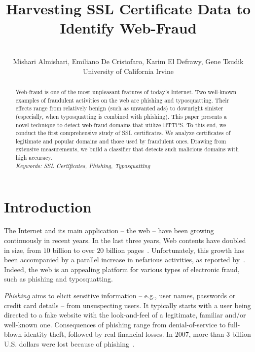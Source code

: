 \documentclass[twocolumn]{article}
\title{\huge\bf Harvesting SSL Certificate Data to\\Identify Web-Fraud}
\author{~\\ Mishari Almishari, Emiliano De Cristofaro, Karim El Defrawy, Gene Tsudik \vspace{0.1cm}\\
{University of California Irvine
   }\\
}
\date{}
\begin{document}
\maketitle
\thispagestyle{empty}
\begin{abstract}
Web-fraud is one of the most unpleasant features of today's Internet.
Two well-known examples of fraudulent activities on the web are phishing and typosquatting.
Their effects range from relatively benign (such as unwanted ads) to
downright sinister (especially, when typosquatting is combined with phishing).
This paper presents a novel technique to detect web-fraud domains that
utilize HTTPS. To this end, we conduct the first comprehensive study
of SSL certificates. We analyze certificates of legitimate and popular domains and
those used by fraudulent ones. Drawing from extensive measurements, we build
a classifier that detects such malicious domains with high accuracy. \vspace*{0.1cm}
~\\
{\it Keywords: SSL Certificates, Phishing, Typosquatting}
\end{abstract}


 \section{Introduction}\label{sec:introduction}
The Internet and its main application -- the web -- have been growing
continuously in recent years. In the last three years, Web contents have doubled in size, 
from $10$ billion to over $20$ billion pages~\cite{wwwsize}.
Unfortunately, this growth has been accompanied by a parallel increase in nefarious activities, as reported by~\cite{incr}.
Indeed, the web is an appealing platform for various types of electronic fraud, such as {phishing} and
{typosquatting}.

 \emph{Phishing} aims to elicit sensitive information 
-- e.g., user names, passwords or credit card details -- from unsuspecting users. 
It typically starts with a user being directed to a fake website with
the look-and-feel of a legitimate, familiar and/or well-known one.
Consequences of phishing range from denial-of-service to
full-blown identity theft, followed by real financial losses. In 2007, more than
3 billion U.S. dollars were lost because of phishing~\cite{phishloss2007}. 
\end{document}
